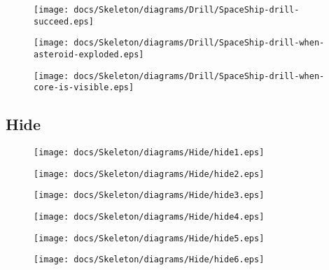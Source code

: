 \begin{figure}[H] 
    \centering 
    \texttt{[image: docs/Skeleton/diagrams/Drill/SpaceShip-drill-succeed.eps]} 
    \caption{} 
\end{figure} 

\begin{figure}[H] 
    \centering 
    \texttt{[image: docs/Skeleton/diagrams/Drill/SpaceShip-drill-when-asteroid-exploded.eps]} 
    \caption{} 
\end{figure} 

\begin{figure}[H] 
    \centering 
    \texttt{[image: docs/Skeleton/diagrams/Drill/SpaceShip-drill-when-core-is-visible.eps]} 
    \caption{} 
\end{figure} 

\subsection{Hide}

\begin{figure}[H] 
    \centering 
    \texttt{[image: docs/Skeleton/diagrams/Hide/hide1.eps]} 
    \caption{} 
\end{figure} 

\begin{figure}[H] 
    \centering 
    \texttt{[image: docs/Skeleton/diagrams/Hide/hide2.eps]} 
    \caption{} 
\end{figure} 

\begin{figure}[H] 
    \centering 
    \texttt{[image: docs/Skeleton/diagrams/Hide/hide3.eps]} 
    \caption{} 
\end{figure} 

\begin{figure}[H] 
    \centering 
    \texttt{[image: docs/Skeleton/diagrams/Hide/hide4.eps]} 
    \caption{} 
\end{figure} 

\begin{figure}[H] 
    \centering 
    \texttt{[image: docs/Skeleton/diagrams/Hide/hide5.eps]} 
    \caption{} 
\end{figure} 

\begin{figure}[H] 
    \centering 
    \texttt{[image: docs/Skeleton/diagrams/Hide/hide6.eps]} 
    \caption{} 
\end{figure} 

